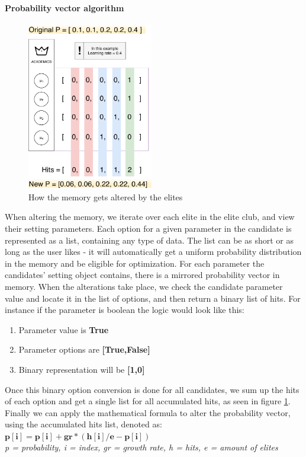 \documentclass[a4paper,english]{report}
\begin{document}
		\paragraph{Probability vector algorithm}
		\begin{figure}
			\caption{How the memory gets altered by the elites}
			\label{fig:memory_insight}
			\includegraphics[width=5.5cm]{memory_insight}
		\end{figure} 
		When altering the memory, we iterate over each elite in the elite club, and view their setting parameters. Each option for a given parameter in the candidate is represented as a list, containing any type of data. The list can be as short or as long as the user likes - it will automatically get a uniform probability distribution in the memory and be eligible for optimization. For each parameter the candidates' setting object contains, there is a mirrored probability vector in memory. When the alterations take place, we check the candidate parameter value and locate it in the list of options, and then return a binary list of hits. For instance if the parameter is boolean the logic would look like this:
		\begin{enumerate}
			\item Parameter value is \textbf{True}
			\item Parameter options are \textbf{[True,False]}
			\item Binary representation will be \textbf{[1,0]}
		\end{enumerate}
		Once this binary option conversion is done for all candidates, we sum up the hits of each option and get a single list for all accumulated hits, as seen in figure \ref{fig:memory_insight}. Finally we can apply the mathematical formula to alter the probability vector, using the accumulated hits list, denoted as:\\
		\begin{math}
			\mathbf{p[i] = p[i] + gr * ( h[i] / e - p[i] )}
		\end{math}\\
		\textit{p = probability, i = index, gr = growth rate, h = hits, e = amount of elites} \\
		
\end{document}

